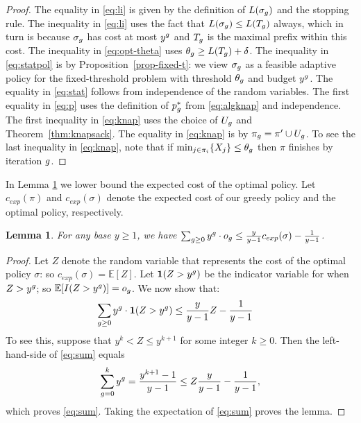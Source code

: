 \documentclass[11pt]{article}
\newcommand{\base}{y}
\newtheorem{lem}[thm]{Lemma}
\theoremstyle{remark}
\theoremstyle{plain}
\theoremstyle{remark}
\begin{document}
\begin{proof}
The equality in \eqref{eq:li} is given by the definition of $L(\sigma_g)$ and the stopping rule. The inequality in \eqref{eq:li} uses the fact that   $L(\sigma_g)  \leq  L(T_g)$ always, which in turn is because $\sigma_g$ has cost at most $\base^\i$ and $T_g$ is the maximal prefix within this cost.  The inequality in \eqref{eq:opt-theta} uses $\theta_g\ge L(T_g)+\delta$. The inequality in \eqref{eq:statpol} is by Proposition~\ref{prop-fixed-t}: we view $\sigma_g$ as a feasible adaptive policy for the fixed-threshold problem with threshold $\theta_g$ and budget $y^g$. The equality in \eqref{eq:stat} follows from independence of the random variables. The first equality in \eqref{eq:p} uses the definition of $p_g^*$ from \eqref{eq:algknap} and independence. The first inequality in \eqref{eq:knap} uses the choice of $U_g$ and   Theorem~\ref{thm:knapsack}. The   equality in \eqref{eq:knap} is by $\pi_g = \pi' \cup U_g$. To see the last inequality in \eqref{eq:knap}, note that   if $\min_{j \in \pi_{i}}\{X_j\} \le \theta_g$ then $\pi$   finishes by iteration $g$. 
\end{proof}



In Lemma \ref{lem:optlb} we lower bound the expected cost of the optimal policy.  Let $c_{exp}(\pi)$ and $c_{exp}(\sigma)$ denote the expected cost of our greedy policy and the optimal policy, respectively.

\begin{lem}
\label{lem:optlb}
For any base   $y \ge 1$, we have $\sum_{\i\ge 0}{\base^\i \cdot o_\i} \leq  \frac{\base }{\base-1} c_{exp}(\sigma) - \frac1{y-1}$.   
\end{lem}
\begin{proof}


    Let $Z$ denote the random variable that represents the cost of the optimal policy $\sigma$: so $c_{exp}(\sigma)=\mathbb{E}[Z]$. Let $\mathbf{1}(Z > \base^\i)$ be the indicator variable for when $Z> \base^\i$; so    $\mathbb{E}[I(Z > \base^\i)]= o_\i$. We now show that:
       \begin{align}
         \sum_{\i\ge 0}{\base^\i \cdot  \mathbf{1}(Z > \base^\i)} &  \le \frac{\base }{\base - 1}Z -\frac1{y-1} \label{eq:sum} 
    \end{align}
To see this, suppose that  $ \base^k < Z \le \base^{k+ 1}$ for some integer $k\ge 0$. Then the left-hand-side of 
\eqref{eq:sum} equals
\[\sum_{\i = 0}^{k}{\base^\i} = \frac{y^{k+1} -1}{y-1} \le    Z \frac{y}{y-1}  - \frac1{y-1} ,\] 
which proves \eqref{eq:sum}. Taking the expectation of \eqref{eq:sum} proves the lemma.    
\end{proof}
\end{document}
